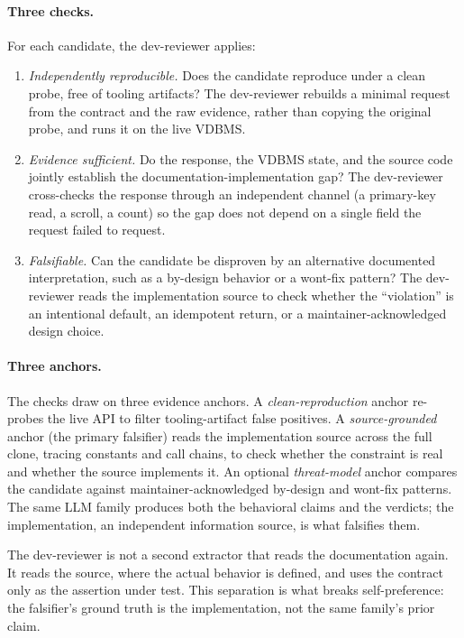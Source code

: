 \documentclass[sigconf]{acmart}
\begin{document}
\paragraph{Three checks.}
For each candidate, the dev-reviewer applies:
\begin{enumerate}
  \item \emph{Independently reproducible.} Does the candidate reproduce under a clean probe, free of tooling artifacts? The dev-reviewer rebuilds a minimal request from the contract and the raw evidence, rather than copying the original probe, and runs it on the live VDBMS.
  \item \emph{Evidence sufficient.} Do the response, the VDBMS state, and the source code jointly establish the documentation-implementation gap? The dev-reviewer cross-checks the response through an independent channel (a primary-key read, a scroll, a count) so the gap does not depend on a single field the request failed to request.
  \item \emph{Falsifiable.} Can the candidate be disproven by an alternative documented interpretation, such as a by-design behavior or a wont-fix pattern? The dev-reviewer reads the implementation source to check whether the ``violation'' is an intentional default, an idempotent return, or a maintainer-acknowledged design choice.
\end{enumerate}

\paragraph{Three anchors.}
The checks draw on three evidence anchors. A \emph{clean-reproduction} anchor re-probes the live API to filter tooling-artifact false positives. A \emph{source-grounded} anchor (the primary falsifier) reads the implementation source across the full clone, tracing constants and call chains, to check whether the constraint is real and whether the source implements it. An optional \emph{threat-model} anchor compares the candidate against maintainer-acknowledged by-design and wont-fix patterns. The same LLM family produces both the behavioral claims and the verdicts; the implementation, an independent information source, is what falsifies them.

The dev-reviewer is not a second extractor that reads the documentation again. It reads the source, where the actual behavior is defined, and uses the contract only as the assertion under test. This separation is what breaks self-preference: the falsifier's ground truth is the implementation, not the same family's prior claim.
\end{document}
